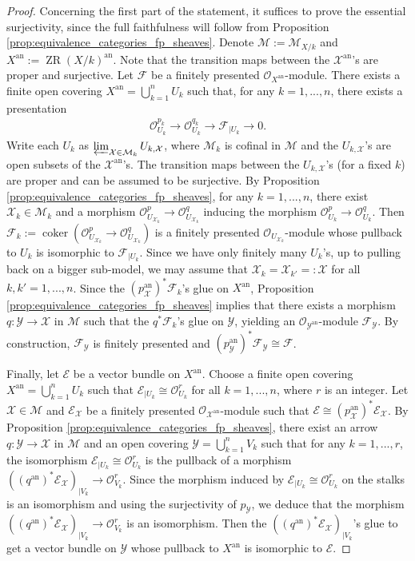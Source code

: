 \documentclass [11pt,reqno]{amsart}
\newcommand{\1}{\mathmybb{1}}
\def\cE{{\mathcal{E}}}
\def\cF{{\mathcal{F}}}
\def\cM{{\mathcal{M}}}
\def\cO{{\mathcal{O}}}
\def\cX{{\mathcal{X}}}
\def\cY{{\mathcal{Y}}}
\def\an{\operatorname{an}}
\def\coker{\operatorname{coker}}
\def\ZR{\operatorname{ZR}}
\begin{document}
\begin{proof}
Concerning the first part of the statement, it suffices to prove the essential surjectivity, since the full faithfulness will follow from Proposition \ref{prop:equivalence_categories_fp_sheaves}. Denote $\cM:=\cM_{X/k}$ and $X^{\an}:=\ZR(X/k)^{\an}$. Note that the transition maps between the $\cX^{\an}$'s are proper and surjective. Let $\cF$ be a finitely presented $\cO_{X^{\an}}$-module. There exists a finite open covering $X^{\an}=\bigcup_{k=1}^{n}U_{k}$ such that, for any $k=1,...,n$, there exists a presentation
\begin{align*}
\cO_{U_{k}}^{p_{k}} \to \cO_{U_{k}}^{q_{k}}\to \cF_{|U_{k}}\to 0.
\end{align*}
Write each $U_{k}$ as $\varprojlim_{\cX\in\cM_{k}}U_{k,\cX}$, where $\cM_{k}$ is cofinal in $\cM$ and the $U_{k,\cX}$'s are open subsets of the $\cX^{\an}$'s. The transition maps between the $U_{k,\cX}$'s (for a fixed $k$) are proper and can be assumed to be surjective. By Proposition \ref{prop:equivalence_categories_fp_sheaves}, for any $k=1,...,n$, there exist $\cX_{k}\in \cM_{k}$ and a morphism $\cO_{U_{\cX_{k}}}^{p} \to \cO_{U_{\cX_{k}}}^{q}$ inducing the morphism $\cO_{U_{k}}^{p} \to \cO_{U_{k}}^{q}$. Then $\cF_{k}:=\coker(\cO_{U_{\cX_{k}}}^{p} \to \cO_{U_{\cX_{k}}}^{q})$ is a finitely presented $\cO_{U_{\cX_{k}}}$-module whose pullback to $U_{k}$ is isomorphic to $\cF_{|U_{k}}$. Since we have only finitely many $U_{k}$'s, up to pulling back on a bigger sub-model, we may assume that $\cX_{k}=\cX_{k'}=:\cX$ for all $k,k'=1,...,n$. Since the $(p_{\cX}^{\an})^{\ast}\cF_{k}$'s glue on $X^{\an}$, Proposition \ref{prop:equivalence_categories_fp_sheaves} implies that there exists a morphism $q:\cY\to \cX$ in $\cM$ such that the $q^{\ast}\cF_{k}$'s glue on $\cY$, yielding an $\cO_{\cY^{\an}}$-module $\cF_{\cY}$. By construction, $\cF_{\cY}$ is finitely presented and $(p_{\cY}^{\an})^{\ast}\cF_{\cY}\cong\cF$.

Finally, let $\cE$ be a vector bundle on $X^{\an}$. Choose a finite open covering $X^{\an}=\bigcup_{k=1}^{n}U_{k}$ such that $\cE_{|U_{k}}\cong \cO_{U_{k}}^{r}$ for all $k=1,...,n$, where $r$ is an integer. Let $\cX\in\cM$ and $\cE_{\cX}$ be a finitely presented $\cO_{\cX^{\an}}$-module such that $\cE\cong (p_{\cX}^{\an})^{\ast}\cE_{\cX}$. By Proposition \ref{prop:equivalence_categories_fp_sheaves}, there exist an arrow $q:\cY\to\cX$ in $\cM$ and an open covering $\cY=\bigcup_{k=1}^{n}V_{k}$ such that for any $k=1,...,r$, the isomorphism $\cE_{|U_{k}}\cong \cO_{U_{k}}^{r}$ is the pullback of a morphism $((q^{\an})^{\ast}\cE_{\cX})_{|V_{k}}\to\cO_{V_{k}}^{r}$. Since the morphism induced by $\cE_{|U_{k}}\cong \cO_{U_{k}}^{r}$ on the stalks is an isomorphism and using the surjectivity of $p_{\cY}$, we deduce that the morphism $((q^{\an})^{\ast}\cE_{\cX})_{|V_{k}}\to\cO_{V_{k}}^{r}$ is an isomorphism. Then the $((q^{\an})^{\ast}\cE_{\cX})_{|V_{k}}$'s glue to get a vector bundle on $\cY$ whose pullback to $X^{\an}$ is isomorphic to $\cE$.
\end{proof}
\end{document}
